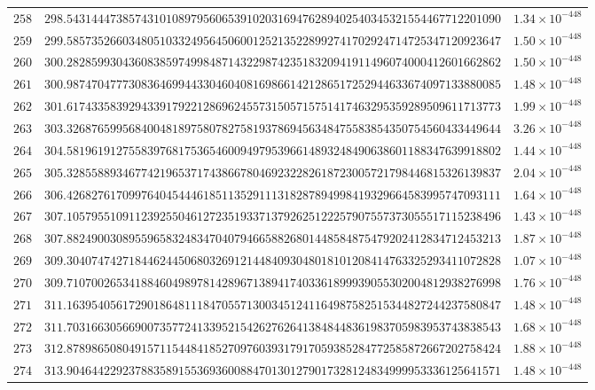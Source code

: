 \documentclass[12pt,reqno]{amsart}
\theoremstyle{remark}
\begin{document}
\begin{longtable}{clc}
$258$ & $298.5431444738574310108979560653910203169476289402540345321554467712201090$ & $1.34\times 10^{-448}$ \\
$259$ & $299.5857352660348051033249564506001252135228992741702924714725347120923647$ & $1.50\times 10^{-448}$ \\
$260$ & $300.2828599304360838597499848714322987423518320941911496074000412601662862$ & $1.50\times 10^{-448}$ \\
$261$ & $300.9874704777308364699443304604081698661421286517252944633674097133880085$ & $1.48\times 10^{-448}$ \\
$262$ & $301.6174335839294339179221286962455731505715751417463295359289509611713773$ & $1.99\times 10^{-448}$ \\
$263$ & $303.3268765995684004818975807827581937869456348475583854350754560433449644$ & $3.26\times 10^{-448}$ \\
$264$ & $304.5819619127558397681753654600949795396614893248490638601188347639918802$ & $1.44\times 10^{-448}$ \\
$265$ & $305.3285588934677421965371743866780469232282618723005721798446815326139837$ & $2.04\times 10^{-448}$ \\
$266$ & $306.4268276170997640454446185113529111318287894998419329664583995747093111$ & $1.64\times 10^{-448}$ \\
$267$ & $307.1057955109112392550461272351933713792625122257907557373055517115238496$ & $1.43\times 10^{-448}$ \\
$268$ & $307.8824900308955965832483470407946658826801448584875479202412834712453213$ & $1.87\times 10^{-448}$ \\
$269$ & $309.3040747427184462445068032691214484093048018101208414763325293411072828$ & $1.07\times 10^{-448}$ \\
$270$ & $309.7107002653418846049897814289671389417403361899939055302004812938276998$ & $1.76\times 10^{-448}$ \\
$271$ & $311.1639540561729018648111847055713003451241164987582515344827244237580847$ & $1.48\times 10^{-448}$ \\
$272$ & $311.7031663056690073577241339521542627626413848448361983705983953743838543$ & $1.68\times 10^{-448}$ \\
$273$ & $312.8789865080491571154484185270976039317917059385284772585872667202758424$ & $1.88\times 10^{-448}$ \\
$274$ & $313.9046442292378835891553693600884701301279017328124834999953336125641571$ & $1.48\times 10^{-448}$ \\

\end{longtable}
\end{document}

